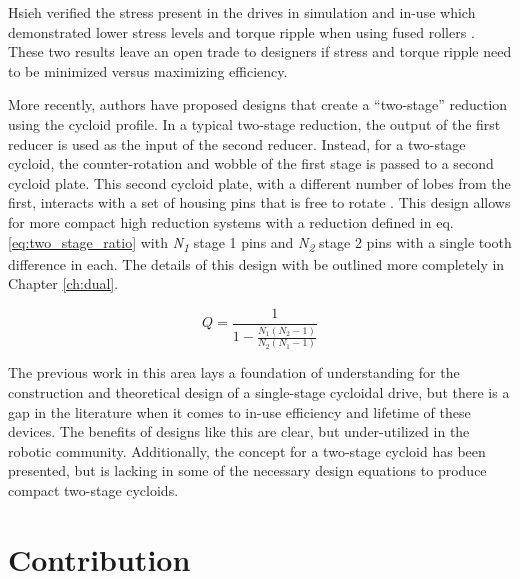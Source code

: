 Hsieh verified the stress present in the drives in simulation and in-use which demonstrated lower stress levels and torque ripple when using fused rollers \cite{ref:hsieh_dynamics}.
These two results leave an open trade to designers if stress and torque ripple need to be minimized versus maximizing efficiency.

More recently, authors have proposed designs that create a ``two-stage'' reduction using the cycloid profile. In a typical two-stage reduction, the output of the first reducer is used as the input of the second reducer. Instead, for a two-stage cycloid, the counter-rotation and wobble of the first stage is passed to a second cycloid plate. This second cycloid plate, with a different number of lobes from the first, interacts with a set of housing pins that is free to rotate \cite{ref:new_two_stage}. This design allows for more compact high reduction systems with a reduction defined in eq. \ref{eq:two_stage_ratio} \cite{ref:two_stage_tooth_mod} with \textit{N\textsubscript{1}} stage 1 pins and \textit{N\textsubscript{2}} stage 2 pins with a single tooth difference in each. The details of this design with be outlined more completely in Chapter \ref{ch:dual}.

\begin{equation} \label{eq:two_stage_ratio}
Q = \frac{1}{1 - \frac{N_1 (N_2-1)}{N_2 (N_1-1)}}
\end{equation}

The previous work in this area lays a foundation of understanding for the construction and theoretical design of a single-stage cycloidal drive, but there is a gap in the literature when it comes to in-use efficiency and lifetime of these devices. The benefits of designs like this are clear, but under-utilized in the robotic community. Additionally, the concept for a two-stage cycloid has been presented, but is lacking in some of the necessary design equations to produce compact two-stage cycloids. 

\section{Contribution} \label{intro:contribution}

